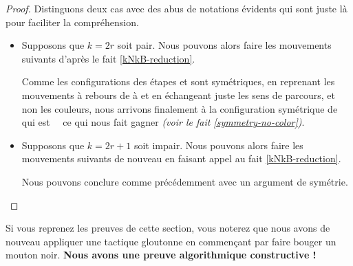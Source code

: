 \begin{proof}
    Distinguons deux cas avec des abus de notations évidents qui sont juste là pour faciliter la compréhension.

    \begin{itemize}[label=\small\textbullet]
        \item  Supposons que $k = 2r$ soit pair. Nous pouvons alors faire les mouvements suivants d'après le fait \ref{kNkB-reduction}.

        \noindent
        Comme les configurations des étapes  et  sont symétriques, en reprenant les mouvements à rebours de  à  et en échangeant juste les sens de parcours, et non les couleurs, nous arrivons finalement à la configuration symétrique de  \,  \, qui est \,  \, ce qui nous fait gagner \emph{(voir le fait \ref{symmetry-no-color})}.


        \item Supposons que $k = 2r + 1$ soit impair. Nous pouvons alors faire les mouvements suivants de nouveau en faisant appel au fait \ref{kNkB-reduction}.

        \noindent
        Nous pouvons conclure comme précédemment avec un argument de symétrie.
    \end{itemize}
\end{proof}



\begin{remark}
    Si vous reprenez les preuves de cette section, vous noterez que nous avons de nouveau appliquer une tactique gloutonne en commençant par faire bouger un mouton noir. \textbf{Nous avons une preuve algorithmique constructive !}
\end{remark}
